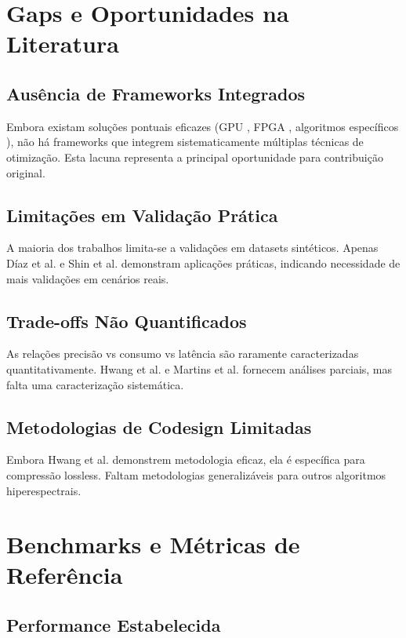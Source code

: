 \section{Gaps e Oportunidades na Literatura}

\subsection{Ausência de Frameworks Integrados}

Embora existam soluções pontuais eficazes (GPU \cite{diaz2019}, FPGA \cite{hwang2011}, algoritmos específicos \cite{lim2022}), não há frameworks que integrem sistematicamente múltiplas técnicas de otimização. Esta lacuna representa a principal oportunidade para contribuição original.

\subsection{Limitações em Validação Prática}

A maioria dos trabalhos limita-se a validações em datasets sintéticos. Apenas Díaz et al. \cite{diaz2019} e Shin et al. \cite{shin2024} demonstram aplicações práticas, indicando necessidade de mais validações em cenários reais.

\subsection{Trade-offs Não Quantificados}

As relações precisão vs consumo vs latência são raramente caracterizadas quantitativamente. Hwang et al. \cite{hwang2011} e Martins et al. \cite{martins2019} fornecem análises parciais, mas falta uma caracterização sistemática.

\subsection{Metodologias de Codesign Limitadas}

Embora Hwang et al. \cite{hwang2011} demonstrem metodologia eficaz, ela é específica para compressão lossless. Faltam metodologias generalizáveis para outros algoritmos hiperespectrais.

\section{Benchmarks e Métricas de Referência}

\subsection{Performance Estabelecida}

